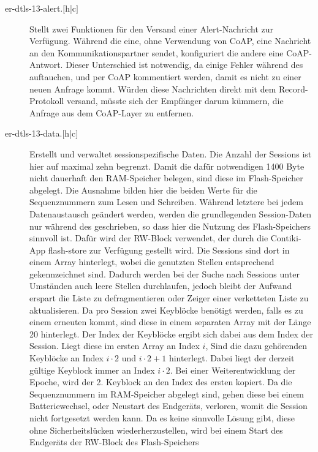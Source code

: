 \begin{description}
  \item[er-dtls-13-alert.{$[$h|c$]$}] Stellt zwei Funktionen für den Versand einer Alert-Nachricht zur Verfügung.
					Während die eine, ohne Verwendung von CoAP, eine Nachricht an den Kommunikationspartner sendet,
					konfiguriert die andere eine CoAP-Antwort. Dieser Unterschied ist notwendig, da einige Fehler während
					des  auftauchen, und per CoAP kommentiert werden, damit es nicht zu einer neuen Anfrage kommt.
					Würden diese Nachrichten direkt mit dem Record-Protokoll versand, müsste sich der Empfänger darum kümmern,
					die Anfrage aus dem CoAP-Layer zu entfernen.
  \item[er-dtls-13-data.{$[$h|c$]$}] Erstellt und verwaltet sessionspezifische Daten. Die Anzahl der Sessions ist hier auf maximal zehn begrenzt.
					Damit die dafür notwendigen 1400 Byte nicht dauerhaft den RAM-Speicher belegen, sind diese im Flash-Speicher
					abgelegt. Die Ausnahme bilden hier die beiden Werte für die Sequenznummern zum Lesen und Schreiben.
					Während letztere bei jedem Datenaustausch geändert werden, werden die grundlegenden Session-Daten nur während
					des  geschrieben, so dass hier die Nutzung des Flash-Speichers sinnvoll ist. Dafür wird der RW-Block
					verwendet, der durch die Contiki-App flash-store zur Verfügung gestellt wird. Die Sessions sind dort in einem
					Array hinterlegt, wobei die genutzten Stellen entsprechend gekennzeichnet sind. Dadurch werden bei der Suche
					nach Sessions unter Umständen auch leere Stellen durchlaufen, jedoch bleibt der Aufwand erspart die Liste zu
					defragmentieren oder Zeiger einer verketteten Liste zu aktualisieren. Da pro Session zwei Keyblöcke benötigt werden,
					falls es zu einem erneuten  kommt, sind diese in einem separaten Array mit der Länge 20 hinterlegt.
					Der Index der Keyblöcke ergibt sich dabei aus dem Index der Session. Liegt diese im ersten Array an Index $ i $,
					Sind die dazu gehörenden Keyblöcke an Index $ i\cdot2 $ und $ i\cdot2+1 $ hinterlegt. Dabei liegt der derzeit gültige
					Keyblock immer an Index $ i\cdot2 $. Bei einer Weiterentwicklung der Epoche, wird der 2. Keyblock an den Index
					des ersten kopiert. Da die Sequenznummern im RAM-Speicher abgelegt sind, gehen diese bei einem Batteriewechsel,
					oder Neustart des Endgeräts, verloren, womit die Session nicht fortgesetzt werden kann. Da es keine sinnvolle Lösung gibt,
					diese ohne Sicherheitslücken wiederherzustellen, wird bei einem Start des Endgeräts der RW-Block des Flash-Speichers

\end{description}
